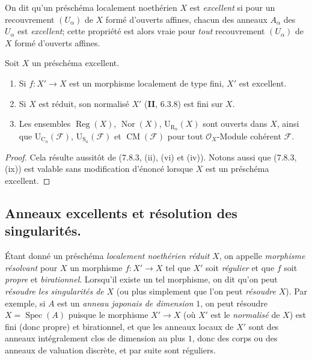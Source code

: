 \begin{env}[7.8.5]
\label{IV.2.s7.8.5-fr}
On dit qu'un préschéma localement noethérien $X$ est \emph{excellent} si pour
un recouvrement $(U_\alpha)$ de $X$ formé d'ouverts affines, chacun des anneaux
$A_\alpha$ des $U_\alpha$ est \emph{excellent}; cette propriété est alors vraie pour
\emph{tout} recouvrement $(U_\alpha)$ de $X$ formé d'ouverts affines.
\end{env}

\begin{proposition}[7.8.6]
Soit $X$ un préschéma excellent.
\begin{enumerate}
\item[\emph{(i)}] Si $f:X'\to X$ est un morphisme localement de type fini, $X'$ est
excellent.


\item[\emph{(ii)}] Si $X$ est réduit, son normalisé $X'$ \textup{(\textbf{II}, 6.3.8)} est fini
sur $X$.
\item[\emph{(iii)}] Les ensembles $\operatorname{Reg}(X)$, $\operatorname{Nor}(X)$,
$\mathrm U_{\mathrm R_n}(X)$ sont ouverts dans $X$, ainsi que
$\mathrm U_{\mathrm C_n}(\mathcal F)$, $\mathrm U_{\mathrm S_n}(\mathcal F)$
et $\operatorname{CM}(\mathcal F)$ pour tout $\mathcal O_X$-Module cohérent
$\mathcal F$.
\end{enumerate}
\end{proposition}

\begin{proof}
Cela résulte aussitôt de (7.8.3, (ii), (vi) et (iv)). Notons aussi que (7.8.3,
(ix)) est valable sans modification d'énoncé lorsque $X$ est un préschéma
excellent.
\end{proof}

\subsection{Anneaux excellents et résolution des singularités.}
\label{subsection:IV.2.7.9-fr}

\begin{env}[7.9.1]
\label{IV.2.s7.9.1-fr}
Étant donné un préschéma \emph{localement noethérien réduit} $X$, on appelle
\emph{morphisme résolvant} pour $X$ un morphisme $f:X'\to X$ tel que $X'$ soit
\emph{régulier} et que $f$ soit \emph{propre} et \emph{birationnel}. Lorsqu'il
existe un tel morphisme, on dit qu'on peut \emph{résoudre les singularités de}
$X$ (ou plus simplement que l'on peut \emph{résoudre} $X$). Par exemple, si
$A$ est un \emph{anneau japonais de dimension} $1$, on peut résoudre
$X=\operatorname{Spec}(A)$ puisque le morphisme $X'\to X$ (où $X'$ est le
\emph{normalisé} de $X$) est fini (donc propre) et birationnel, et que les
anneaux locaux de $X'$ sont des anneaux intégralement clos de dimension au plus $1$,
donc des corps ou des anneaux de valuation discrète, et par suite sont réguliers.
\end{env}

